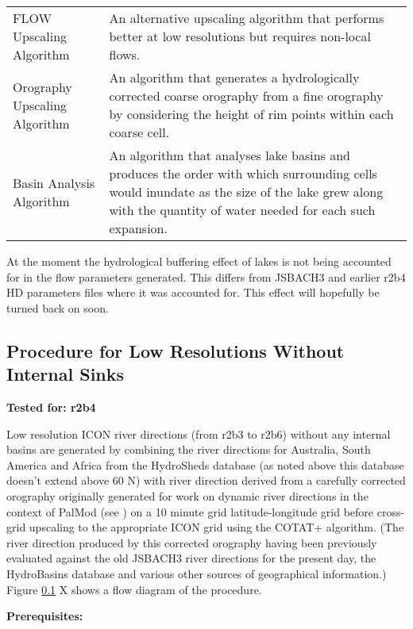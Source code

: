 \documentclass{article}
\begin{document}
{\begin{center}
\begin{longtable} { | l | p{8cm} |}
FLOW Upscaling Algorithm & An alternative upscaling algorithm that performs better at low resolutions but requires non-local flows.\\
Orography Upscaling Algorithm &An algorithm that generates a hydrologically corrected coarse orography from a fine orography by considering the height of rim points within each coarse cell. \\
Basin Analysis Algorithm & An algorithm that analyses lake basins and produces the order with which surrounding cells would inundate as the size of the lake grew along with the quantity of water needed for each such expansion. \\
\hline
\end{longtable}
\label{table-tools-descs}
\end{center}}

At the moment the hydrological buffering effect of lakes is not being accounted for in the flow parameters generated. This differs from JSBACH3 and earlier r2b4 HD parameters files where it was accounted for. This effect will hopefully be turned back on soon.

\subsection{Procedure for Low Resolutions Without Internal Sinks}
\noindent\textbf{Tested for: r2b4}

Low resolution ICON river directions (from r2b3 to r2b6) without any internal basins are generated by combining the river directions for Australia, South America and Africa from the HydroSheds database (as noted above this database doesn't extend above 60 \degree N) with river direction derived from a carefully corrected orography originally generated for work on dynamic river directions in the context of PalMod (see \cite{gmd-11-4291-2018}) on a 10 minute grid latitude-longitude grid before cross-grid upscaling to the appropriate ICON grid using the COTAT+ algorithm. (The river direction produced by this corrected orography having been previously evaluated against the old JSBACH3 river directions for the present day, the HydroBasins database and various other sources of geographical information.) Figure \ref{} X shows a flow diagram of the procedure. \newline

\noindent\textbf{Prerequisites:}
\end{document}
